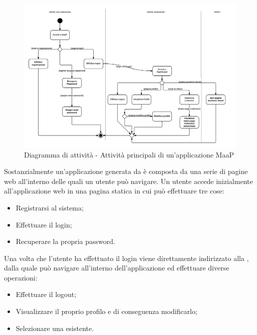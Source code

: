 \begin{figure}[H]
\centering
\includegraphics[scale=0.12]{uml/MaaP - Attivita Principali.png}
\caption{Diagramma di attività - Attività principali di un'applicazione MaaP}
\end{figure}

Sostanzialmente un'applicazione generata da  è composta da una serie di pagine web all'interno delle quali un utente può navigare. Un utente accede inizialmente all'applicazione web in una pagina statica in cui può effettuare tre cose:

\begin{itemize}

	\item Registrarsi al sistema;
	\item Effettuare il login;
	\item Recuperare la propria password.

\end{itemize}

Una volta che l'utente ha effettuato il login viene direttamente indirizzato alla , dalla quale può navigare all'interno dell'applicazione ed effettuare diverse operazioni:

\begin{itemize}

	\item Effettuare il logout;
	\item Visualizzare il proprio profilo e di conseguenza modificarlo;
	\item Selezionare una  esistente.

\end{itemize}

